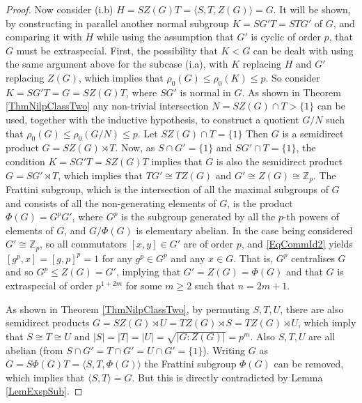 \documentclass{amsart}
\theoremstyle{observation}
\theoremstyle{definition}
\theoremstyle{remark}
\numberwithin{equation}{section}
\begin{document}
\begin{proof}
\vspace{1mm}

Now consider \textup{(i.b)} $H = SZ(G)T = \langle S, T, Z(G) \rangle = G$. It will be shown, by constructing in parallel another normal subgroup $K = SG'T = STG'$ of $G$, and comparing it with $H$ while using the assumption that $G'$ is cyclic of order $p$, that $G$ must be extraspecial. First, the possibility that $K < G$ can be dealt with using the same argument above for the subcase \textup{(i.a)}, with $K$ replacing $H$ and $G'$ replacing $Z(G)$, which implies that $\rho_0(G) \leq \rho_0(K) \leq p$. So consider $K = SG'T = G = SZ(G)T$, where $SG'$ is normal in $G$. As shown in Theorem \ref{ThmNilpClassTwo} any non-trivial intersection $N = SZ(G) \cap T > \{1\}$ can be used, together with the inductive hypothesis, to construct a quotient $G/N$ such that $\rho_0(G) \leq \rho_0(G/N) \leq p$. Let $SZ(G) \cap T = \{1\}$ Then $G$ is a semidirect product $G = SZ(G) \rtimes T$. Now, as $S \cap G' = \{1\}$ and $SG' \cap T = \{1\}$, the condition $K = SG'T = SZ(G)T$ implies that $G$ is also the semidirect product $G = SG' \rtimes T$, which implies that $TG' \cong TZ(G)$ and $G' \cong Z(G) \cong \mathbb{Z}_p$. The Frattini subgroup, which is the intersection of all the maximal subgroups of $G$ and consists of all the non-generating elements of $G$, is the product $\Phi(G) = G^pG'$, where $G^p$ is the subgroup generated by all the $p$-th powers of elements of $G$, and $G/\Phi(G)$ is elementary abelian. In the case being considered $G' \cong \mathbb{Z}_p$, so all commutators $[x, y] \in G'$ are of order $p$, and \ref{EqCommId2} yields $[g^p, x] = [g, p]^p = 1$ for any $g^p \in G^p$ and any $x \in G$. That is, $G^p$ centralises $G$ and so $G^p \leq Z(G) = G'$, implying that $G' = Z(G) = \Phi(G)$ and that $G$ is extraspecial of order $p^{1 + 2m}$ for some $m \geq 2$ such that $n = 2m + 1$.

\vspace{1mm}

As shown in Theorem \ref{ThmNilpClassTwo}, by permuting $S, T, U$, there are also semidirect products $G = SZ(G) \rtimes U = TZ(G) \rtimes S =  TZ(G) \rtimes U$, which imply that $S \cong T \cong U$ and $|S| = |T| = |U| = \sqrt{|G:Z(G)|} = p^m$. Also $S, T, U$ are all abelian (from $S \cap G' = T \cap G' = U \cap G' = \{1\}$). Writing $G$ as $G = S\Phi(G)T = \langle S, T, \Phi(G) \rangle$ the Frattini subgroup $\Phi(G)$ can be removed, which implies that $\langle S, T \rangle = G$. But this is directly contradicted by Lemma \ref{LemExspSub}.
\end{proof}
\end{document}
